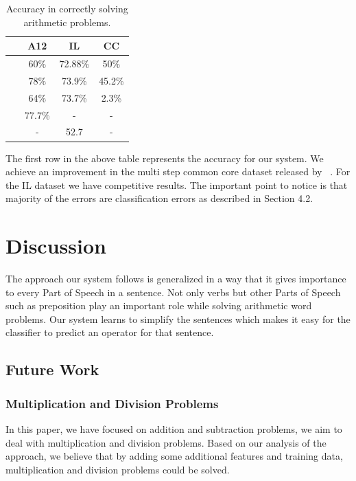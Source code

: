 \documentclass[11pt]{article}
\begin{document}
\begin{table}[h]
\begin{center}
\begin{tabular}{|c|c|c|c|}
\hline
\bf & \bf A12 & \bf IL & \bf CC \\
\hline
 & 60\% & 72.88\% & 50\% \\
\hline
~\cite{Roy:15} & 78\% & 73.9\% & 45.2\% \\
\hline
~\cite{Kushman:15} & 64\% & 73.7\% & 2.3\% \\
\hline
~\cite{Hosseini:14} & 77.7\% & - & - \\
\hline
~\cite{Roy: 15} & - & 52.7 & - \\
\hline
\end{tabular}
\end{center}
\caption{\label{results-table} Accuracy in correctly solving arithmetic problems.}
\end{table}

The first row in the above table represents the accuracy for our system. We achieve an improvement in the multi step common core dataset released by ~\cite{Roy:15}. For the IL dataset we have competitive results. The important point to notice is that majority of the errors are classification errors as described in Section 4.2.

\section{Discussion}
The approach our system follows is generalized in a way that it gives importance to every Part of Speech in a sentence. Not only verbs but other Parts of Speech such as preposition play an important role while solving arithmetic word problems. Our system learns to simplify the sentences which makes it easy for the classifier to predict an operator for that sentence. 

\subsection{Future Work}

\subsubsection{Multiplication and Division Problems}
In this paper, we have focused on addition and subtraction problems, we aim to deal with multiplication and division problems. Based on our analysis of the approach, we believe that by adding some additional features and training data, multiplication and division problems could be solved.
\newpage
\end{document}
